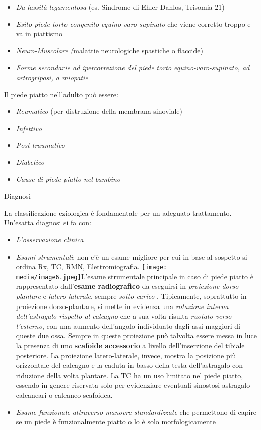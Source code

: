 \documentclass[]{article}
\begin{document}
\begin{itemize}
\item
  \emph{Da lassità legamentosa} (es. Sindrome di Ehler-Danlos, Trisomia
  21)
\item
  \emph{Esito piede torto congenito equino-varo-supinato} che viene
  corretto troppo e va in piattismo
\item
  \emph{Neuro-Muscolare (}malattie neurologiche spastiche o flaccide)
\item
  \emph{Forme secondarie ad ipercorrezione del piede torto
  equino-varo-supinato, ad artrogriposi, a miopatie}
\end{itemize}

Il piede piatto nell'adulto può essere:

\begin{itemize}
\item
  \emph{Reumatico} (per distruzione della membrana sinoviale)
\item
  \emph{Infettivo}
\item
  \emph{Post-traumatico}
\item
  \emph{Diabetico }
\item
  \emph{\emph{Cause di piede piatto nel bambino}}
\end{itemize}

Diagnosi

La classificazione eziologica è fondamentale per un adeguato
trattamento. Un'esatta diagnosi si fa con:

\begin{itemize}
\item
  \emph{L'osservazione clinica }
\item
  \emph{Esami strumentali}: non c'è un esame migliore per cui in base al
  sospetto si ordina Rx, TC, RMN, Elettromiografia.
  \texttt{[image: media/image6.jpeg]}L'esame
  strumentale principale in caso di piede piatto è rappresentato
  dall'\textbf{esame radiografico} da eseguirsi in \emph{proiezione
  dorso-plantare} e \emph{latero-laterale}, sempre \emph{sotto carico} .
  Tipicamente, soprattutto in proiezione dorso-plantare, si mette in
  evidenza una \emph{rotazione interna dell'astragalo rispetto al
  calcagno} che a sua volta risulta \emph{ruotato verso l'esterno}, con
  una aumento dell'angolo individuato dagli assi maggiori di queste due
  ossa. Sempre in queste proiezione può talvolta essere messa in luce la
  presenza di uno \textbf{scafoide accessorio} a livello dell'inserzione
  del tibiale posteriore. La proiezione latero-laterale, invece, mostra
  la posizione più orizzontale del calcagno e la caduta in basso della
  testa dell'astragalo con riduzione della volta plantare. La TC ha un
  uso limitato nel piede piatto, essendo in genere riservata solo per
  evidenziare eventuali sinostosi astragalo-calcaneari o
  calcaneo-scafoidea.
\item
  \emph{Esame funzionale} \emph{attraverso manovre standardizzate} che
  permettono di capire se un piede è funzionalmente piatto o lo è solo
  morfologicamente
\end{itemize}
\end{document}
